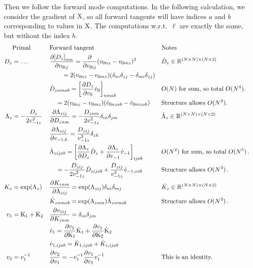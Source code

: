 Then we follow the forward mode computations. In the following calculation, we consider the gradient of ${\mathrm{{X}}}$, so all forward tangents will have indices $a$ and $b$ corresponding to values in ${\mathrm{{X}}}$. The computations w.r.t.~$\boldsymbol \ell$ are exactly the same, but without the index $b$.
\begin{align}
&\text{Primal} && \text{Forward tangent} && \text{Notes} \nonumber \\
D_z &= \dots && \pderiv[{[D_z]}_{nm}]{v_{0ij}} = \pderiv{v_{0ij}} (v_{0nz} - v_{0mz})^2 &&  \dot D_z \in \Reals^{(N\times N) \times (N\times 2)}  \nonumber \\
& && \qquad = 2(v_{0nz} - v_{0mz})(\delta_{ni}\delta_{zj} - \delta_{mi}\delta_{zj}) &&\\
& && \dot D_{znmab} = \left[\pderiv[D_z]{v_0} \dot v_0\right]_{nmab} && O(N) \text{ for sum, so total } O(N^4). \\
& && \quad = 2 (v_{0nz} - v_{0mz}) (\dot v_{0nzab} - \dot v_{0mzab})&& \text{Structure allows } O(N^3). \\
\Lambda_z &= - \frac{D_z}{2v_{-1z}^2} && \pderiv[\Lambda_{zij}]{D_{znm}} = - \frac{D_{znm}}{2v_{-1z}^2}\delta_{in}\delta_{jm}  && \dot \Lambda_z \in \Reals^{(N\times N) \times (N\times 2)} \\
& && \pderiv[\Lambda_{zij}]{v_{-1,k}} = \frac{D_{zij}}{v_{-1z}^3} \delta_{zk} && \\
& && \dot \Lambda_{zijab} = \left[\pderiv[\Lambda_{z}]{D_{z}} \dot D_{z} + \pderiv[\Lambda_{z}]{v_{-1}} \dot v_{-1}\right]_{ijab} && O(N^2)\text{ for sum, so total }O(N^5)\,. \\
& && \quad = - \frac{D_{zij}}{2v_{-1z}^2} \dot D_{zijab} + \frac{D_{zij}}{v_{-1z}^3} \dot v_{-1,zab} && \text{Structure allows } O(N^3)\,. \\
K_z &= \exp(\Lambda_z) && \pderiv[K_{znm}]{\Lambda_{zij}} = \exp(\Lambda_{zij})\delta_{ni}\delta_{mj} && \dot K_z \in \Reals^{(N\times N)\times (N\times 2)} \\
& && \dot K_{znmab} = \exp(\Lambda_{znm})\dot\Lambda_{znmab} && \text{Structure allows } O(N^3)\,. \\
v_1 &= \mat K_1 + \mat K_2 && \pderiv[v_{1ij}]{K_{znm}} = \delta_{in}\delta_{jm} && \\
& && \dot v_1 = \pderiv[v_1]{\mat K_1} \dot{\mat K}_1 + \pderiv[v_1]{\mat K_2} \dot{\mat K}_2 && \\
& && \dot v_{1,ijab} =  \dot K_{1,ijab} + \dot K_{z,ijab} && \\
v_2&= v_1\inv && \pderiv[v_2]{v_1} = -v_1\inv \pderiv[v_1]{v_1}v_1\inv && \text{This is an identity.} \\

\end{align}
